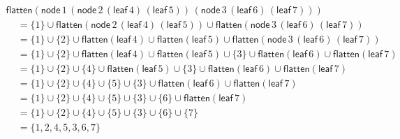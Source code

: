 \documentclass{article}
\begin{document}
\begin{center}
  \begin{math}
    \begin{array}{lll}
      \mathsf{flatten}(\mathsf{node}\,1\,(\mathsf{node}\,2\, (\mathsf{leaf}\, 4)\,
      (\mathsf{leaf}\, 5))\, (\mathsf{node}\, 3\, (\mathsf{leaf}\, 6)\,
      (\mathsf{leaf}\, 7))) \\
      \,\,\,\,\,\,\,= \{1\} \cup \mathsf{flatten}(\mathsf{node}\,2\, (\mathsf{leaf}\, 4)\,
      (\mathsf{leaf}\, 5)) \cup \mathsf{flatten}(\mathsf{node}\, 3\, (\mathsf{leaf}\, 6)\,
      (\mathsf{leaf}\, 7))\\
      \,\,\,\,\,\,\,= \{1\} \cup \{2\} \cup \mathsf{flatten}(\mathsf{leaf}\, 4) \cup \mathsf{flatten}(\mathsf{leaf}\, 5) \cup \mathsf{flatten}(\mathsf{node}\, 3\, (\mathsf{leaf}\, 6)\,
      (\mathsf{leaf}\, 7))\\
      \,\,\,\,\,\,\,= \{1\} \cup \{2\} \cup \mathsf{flatten}(\mathsf{leaf}\, 4) \cup \mathsf{flatten}(\mathsf{leaf}\, 5) \cup \{3\} \cup \mathsf{flatten}(\mathsf{leaf}\, 6) \cup \mathsf{flatten}(\mathsf{leaf}\, 7)\\
      \,\,\,\,\,\,\,= \{1\} \cup \{2\} \cup \{4\} \cup \mathsf{flatten}(\mathsf{leaf}\, 5) \cup \{3\} \cup \mathsf{flatten}(\mathsf{leaf}\, 6) \cup \mathsf{flatten}(\mathsf{leaf}\, 7)\\
      \,\,\,\,\,\,\,= \{1\} \cup \{2\} \cup \{4\} \cup \{5\} \cup \{3\} \cup \mathsf{flatten}(\mathsf{leaf}\, 6) \cup \mathsf{flatten}(\mathsf{leaf}\, 7)\\
      \,\,\,\,\,\,\,= \{1\} \cup \{2\} \cup \{4\} \cup \{5\} \cup \{3\} \cup \{6\} \cup \mathsf{flatten}(\mathsf{leaf}\, 7)\\
      \,\,\,\,\,\,\,= \{1\} \cup \{2\} \cup \{4\} \cup \{5\} \cup \{3\} \cup \{6\} \cup \{7\}\\
      \,\,\,\,\,\,\,= \{1, 2, 4, 5, 3, 6, 7\}\\
    \end{array}
  \end{math}
\end{center}
\end{document}
